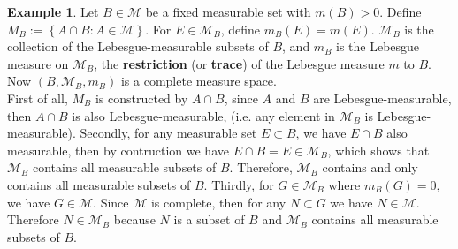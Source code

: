 \documentclass[reqno]{amsart}
\theoremstyle{definition}
\newtheorem{example}{Example}
\begin{document}
\begin{example}{\mbox{}}
Let $B \in \mathcal{M}$ be a fixed measurable set with $m(B) > 0$. Define $M_{B}:= \left\{A \cap B: A \in \mathcal{M}\right\}$. For $E \in \mathcal{M}_{B}$, define $m_{B}(E) = m(E)$. $\mathcal{M}_{B}$ is the collection of the Lebesgue-measurable subsets of $B$, and $m_{B}$ is the Lebesgue measure on $\mathcal{M}_{B}$, the \textbf{restriction} (or \textbf{trace}) of the Lebesgue measure $m$ to $B$. Now $(B, \mathcal{M}_{B}, m_{B})$ is a complete measure space.
~\\

First of all, $M_{B}$ is constructed by $A \cap B$, since $A$ and $B$ are Lebesgue-measurable, then $A \cap B$ is also Lebesgue-measurable, (i.e. any element in $\mathcal{M}_{B}$ is Lebesgue-measurable). Secondly, for any measurable set $E \subset B$, we have $E \cap B$ also measurable, then by contruction we have $E \cap B = E \in \mathcal{M}_{B}$, which shows that $\mathcal{M}_{B}$ contains all measurable subsets of $B$. Therefore, $\mathcal{M}_{B}$ contains and only contains all measurable subsets of $B$. Thirdly, for $G \in \mathcal{M}_{B}$ where $m_{B}(G) = 0$, we have $G \in \mathcal{M}$. Since $\mathcal{M}$ is complete, then for any $N \subset G$ we have $N \in \mathcal{M}$. Therefore $N \in \mathcal{M}_{B}$ because $N$ is a subset of $B$ and $\mathcal{M}_{B}$ contains all measurable subsets of $B$.
\end{example}
\end{document}
